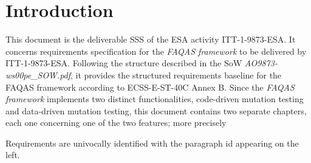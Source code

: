 
\section{Introduction}
\label{sec:introduction}

This document is the deliverable SSS of the ESA activity ITT-1-9873-ESA. It concerns requirements specification for the \emph{FAQAS framework} to be delivered by ITT-1-9873-ESA. Following the structure described in the SoW \emph{AO9873-ws00pe\_SOW.pdf}, it provides the structured requirements baseline for the FAQAS framework according to ECSS-E-ST-40C Annex B. Since the \emph{FAQAS framework} implements two distinct functionalities, code-driven mutation testing and data-driven mutation testing, this document contains two separate chapters, each one concerning one of the two features; more precisely 

Requirements are univocally identified with the paragraph id appearing on the left.
 
 
 

